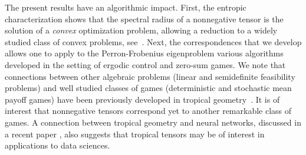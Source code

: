 \documentclass{amsart}
\newcommand{\0}{\mathbf{0}}
\newcommand{\1}{\mathbf{1}}
\theoremstyle{remark}
\numberwithin{equation}{section} %
\begin{document}
The present results have an algorithmic impact. First,
the entropic characterization shows that the spectral
radius of a nonnegative tensor is the solution
of a {\em convex} optimization problem,
allowing a reduction to a widely studied class
of convex problems, see~\cite{CS16}.
Next, the correspondences that we develop allows one to apply to the Perron-Frobenius eigenproblem various algorithms developed in the setting of
ergodic control and zero-sum games. %
%
%
We note that connections between other algebraic problems
(linear and semidefinite feasibility problems) and well studied classes
of games (deterministic and stochastic mean payoff games) have been
previously developed in tropical geometry~\cite{AGG09,xasgmsissacjsc}.
It is of interest that nonnegative tensors correspond yet to another remarkable class of games.   {{A connection between tropical geometry and neural networks, discussed in a recent paper \cite{ZNL18}, also suggests that tropical tensors may be of interest in applications to data sciences.}}

%

%
%
%
%
%
 
%
%
%
\end{document}
